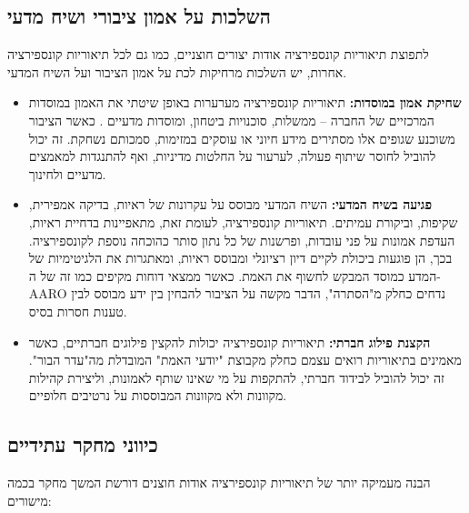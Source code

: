 \documentclass[12pt,a4paper]{article}
\begin{document}
\subsection{השלכות על אמון ציבורי ושיח מדעי}

לתפוצת תיאוריות קונספירציה אודות יצורים חוצניים, כמו גם לכל תיאוריות קונספירציה אחרות, יש השלכות מרחיקות לכת על אמון הציבור ועל השיח המדעי.

\begin{itemize}
    \item \textbf{שחיקת אמון במוסדות:} תיאוריות קונספירציה מערערות באופן שיטתי את האמון במוסדות המרכזיים של החברה – ממשלות, סוכנויות ביטחון, ומוסדות מדעיים \cite{bowes2023conspiracy}. כאשר הציבור משוכנע שגופים אלו מסתירים מידע חיוני או עוסקים במזימות, סמכותם נשחקת. זה יכול להוביל לחוסר שיתוף פעולה, לערעור על החלטות מדיניות, ואף להתנגדות למאמצים מדעיים ולחינוך.
    \item \textbf{פגיעה בשיח המדעי:} השיח המדעי מבוסס על עקרונות של ראיות, בדיקה אמפירית, שקיפות, וביקורת עמיתים. תיאוריות קונספירציה, לעומת זאת, מתאפיינות בדחיית ראיות, העדפת אמונות על פני עובדות, ופרשנות של כל נתון סותר כהוכחה נוספת לקונספירציה. בכך, הן פוגעות ביכולת לקיים דיון רציונלי ומבוסס ראיות, ומאתגרות את הלגיטימיות של המדע כמוסד המבקש לחשוף את האמת. כאשר ממצאי דוחות מקיפים כמו זה של ה-AARO נדחים כחלק מ"הסתרה", הדבר מקשה על הציבור להבחין בין ידע מבוסס לבין טענות חסרות בסיס.
    \item \textbf{הקצנת פילוג חברתי:} תיאוריות קונספירציה יכולות להקצין פילוגים חברתיים, כאשר מאמינים בתיאוריות רואים עצמם כחלק מקבוצת "יודעי האמת" המובדלת מה"עדר הבור". זה יכול להוביל לבידוד חברתי, להתקפות על מי שאינו שותף לאמונות, וליצירת קהילות מקוונות ולא מקוונות המבוססות על נרטיבים חלופיים.
\end{itemize}

\subsection{כיווני מחקר עתידיים}

הבנה מעמיקה יותר של תיאוריות קונספירציה אודות חוצנים דורשת המשך מחקר בכמה מישורים:
\end{document}
